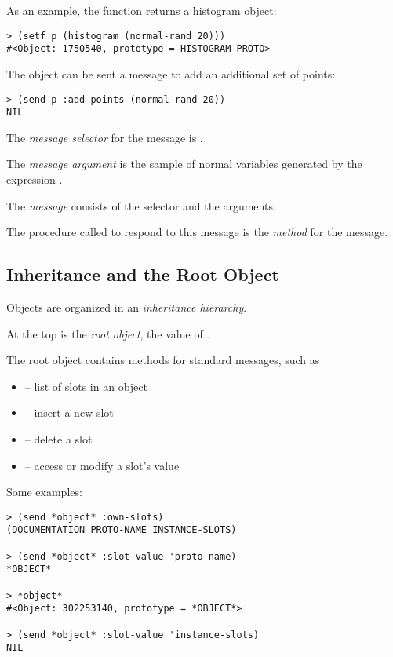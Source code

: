 \begin{slide}{}
As an example, the  function returns a histogram object:
{\Large
\begin{verbatim}
> (setf p (histogram (normal-rand 20)))
#<Object: 1750540, prototype = HISTOGRAM-PROTO>
\end{verbatim}}
The object can be sent a message to add an additional set of points:
{\Large
\begin{verbatim}
> (send p :add-points (normal-rand 20))
NIL
\end{verbatim}}
The {\em message selector}\/ for the message is .

The {\em message argument}\/ is the sample of normal variables
generated by the expression .

The {\em message}\/ consists of the selector and the arguments.

The procedure called to respond to this message is the {\em method}\/
for the message.
\end{slide}

\begin{slide}{}
\subsection{Inheritance and the Root Object}
Objects are organized in an {\em inheritance hierarchy}.

At the top is the {\em root object}, the value of .

The root object contains methods for standard messages, such as
\begin{itemize}
\item[]  -- list of slots in an object
\item[]  -- insert a new slot 
\item[]  -- delete a slot
\item[]  -- access or modify a slot's value
\end{itemize}
\end{slide}

\begin{slide}{}
Some examples:
{\Large
\begin{verbatim}
> (send *object* :own-slots)
(DOCUMENTATION PROTO-NAME INSTANCE-SLOTS)

> (send *object* :slot-value 'proto-name)
*OBJECT*

> *object*
#<Object: 302253140, prototype = *OBJECT*>

> (send *object* :slot-value 'instance-slots)
NIL
\end{verbatim}}
\end{slide}

